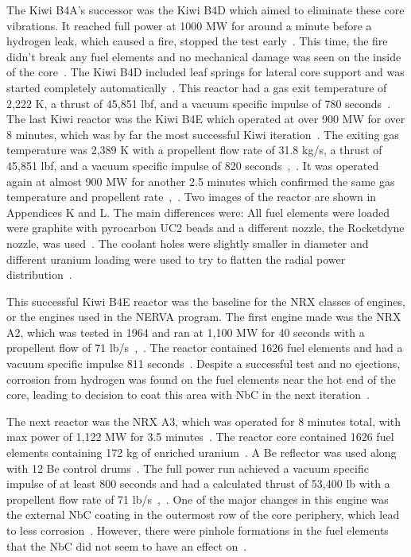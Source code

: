 \documentclass{article}
\begin{document}
The Kiwi B4A's successor was the Kiwi B4D which aimed to eliminate these core vibrations. It reached full power at 1000 MW for around a minute before a hydrogen leak, which caused a fire, stopped the test early~\cite{gerrish2014nuclear}. This time, the fire didn't break any fuel elements and no mechanical damage was seen on the inside of the core~\cite{finseth1991rover}. The Kiwi B4D included leaf springs for lateral core support and was started completely automatically~\cite{finseth1991rover}. This reactor had a gas exit temperature of 2,222 K, a thrust of 45,851 lbf, and a vacuum specific impulse of 780 seconds~\cite{presrovernerva}.
The last Kiwi reactor was the Kiwi B4E which operated at over 900 MW for over 8 minutes, which was by far the most successful Kiwi iteration~\cite{gerrish2014nuclear}. The exiting gas temperature was 2,389 K with a propellent flow rate of 31.8 kg/s, a thrust of 45,851 lbf, and a vacuum specific impulse of 820 seconds~\cite{finseth1991rover},~\cite{presrovernerva}. It was operated again at almost 900 MW for another 2.5 minutes which confirmed the same gas temperature and propellent rate~\cite{finseth1991rover},~\cite{gerrish2014nuclear}. Two images of the reactor are shown in Appendices K and L. The main differences were: All fuel elements were loaded were graphite with pyrocarbon UC2 beads and a different nozzle, the Rocketdyne nozzle, was used~\cite{finseth1991rover}. The coolant holes were slightly smaller in diameter and different uranium loading were used to try to flatten the radial power distribution~\cite{finseth1991rover}.


This successful Kiwi B4E reactor was the baseline for the NRX classes of engines, or the engines used in the NERVA program. The first engine made was the NRX A2, which was tested in 1964 and ran at 1,100 MW for 40 seconds with a propellent flow of 71 lb/s~\cite{gerrish2014nuclear},~\cite{ledbetter1969nerva}. The reactor contained 1626 fuel elements and had a vacuum specific impulse 811 seconds~\cite{finseth1991rover}. Despite a successful test and no ejections, corrosion from hydrogen was found on the fuel elements near the hot end of the core, leading to decision to coat this area with NbC in the next iteration~\cite{finseth1991rover}.


The next reactor was the NRX A3, which was operated for 8 minutes total, with max power of 1,122 MW for 3.5 minutes~\cite{gerrish2014nuclear}. The reactor core contained 1626 fuel elements containing 172 kg of enriched uranium~\cite{finseth1991rover}. A Be reflector was used along with 12 Be control drums~\cite{finseth1991rover}. The full power run achieved a vacuum specific impulse of at least 800 seconds and had a calculated thrust of 53,400 lb with a propellent flow rate of 71 lb/s~\cite{finseth1991rover},~\cite{ledbetter1969nerva}. One of the major changes in this engine was the external NbC coating in the outermost row of the core periphery, which lead to less corrosion~\cite{finseth1991rover}. However, there were pinhole formations in the fuel elements that the NbC did not seem to have an effect on~\cite{finseth1991rover}. 
\end{document}
